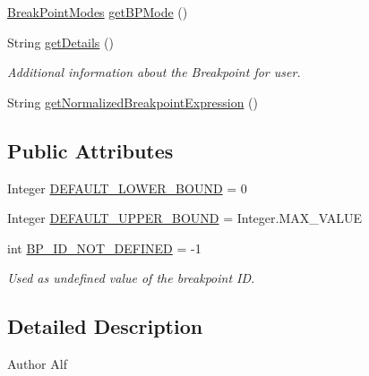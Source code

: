 \begin{DoxyCompactItemize}
\hyperlink{enumgov_1_1nasa_1_1jpf_1_1inspector_1_1server_1_1breakpoints_1_1_break_point_modes}{Break\+Point\+Modes} \hyperlink{interfacegov_1_1nasa_1_1jpf_1_1inspector_1_1interfaces_1_1_break_point_status_a34108750e104d20827540014f408424c}{get\+B\+P\+Mode} ()
\item 
String \hyperlink{interfacegov_1_1nasa_1_1jpf_1_1inspector_1_1interfaces_1_1_break_point_status_abf7d5b295fb4bbd41565231b43ff8593}{get\+Details} ()
\begin{DoxyCompactList}\small\item\em Additional information about the Breakpoint for user. \end{DoxyCompactList}\item 
String \hyperlink{interfacegov_1_1nasa_1_1jpf_1_1inspector_1_1interfaces_1_1_break_point_status_a297c8455f6e0f6cbe9313c8007da20de}{get\+Normalized\+Breakpoint\+Expression} ()
\end{DoxyCompactItemize}
\subsection*{Public Attributes}
\begin{DoxyCompactItemize}
\item 
Integer \hyperlink{interfacegov_1_1nasa_1_1jpf_1_1inspector_1_1interfaces_1_1_break_point_creation_information_a40131b93f82a84ed5322c4dc5ca4175e}{D\+E\+F\+A\+U\+L\+T\+\_\+\+L\+O\+W\+E\+R\+\_\+\+B\+O\+U\+ND} = 0
\item 
Integer \hyperlink{interfacegov_1_1nasa_1_1jpf_1_1inspector_1_1interfaces_1_1_break_point_creation_information_af917e7de77b2a6fc93c24e1c5a4a5759}{D\+E\+F\+A\+U\+L\+T\+\_\+\+U\+P\+P\+E\+R\+\_\+\+B\+O\+U\+ND} = Integer.\+M\+A\+X\+\_\+\+V\+A\+L\+UE
\item 
int \hyperlink{interfacegov_1_1nasa_1_1jpf_1_1inspector_1_1interfaces_1_1_break_point_creation_information_a24626231e3744e59f505d0731d4ca9e1}{B\+P\+\_\+\+I\+D\+\_\+\+N\+O\+T\+\_\+\+D\+E\+F\+I\+N\+ED} = -\/1
\begin{DoxyCompactList}\small\item\em Used as undefined value of the breakpoint ID. \end{DoxyCompactList}\end{DoxyCompactItemize}


\subsection{Detailed Description}
\begin{DoxyAuthor}{Author}
Alf 
\end{DoxyAuthor}


